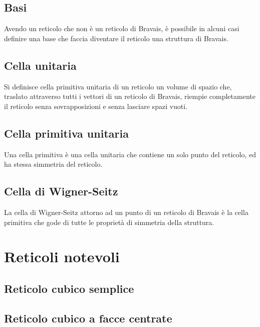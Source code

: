 \documentclass[10pt,a4paper]{report}
\begin{document}
		\subsection{Basi}
			Avendo un reticolo che non è un reticolo di Bravais, è possibile in alcuni casi definire una base che faccia diventare il reticolo una struttura di Bravais.
		
		\subsection{Cella unitaria}

			Si definisce cella primitiva unitaria di un reticolo un volume di spazio che, traslato attraverso tutti i vettori di un reticolo di Bravais, riempie completamente il reticolo senza sovrapposizioni e senza lasciare spazi vuoti.

		\subsection{Cella primitiva unitaria}
			Una cella primitiva è una cella unitaria che contiene un solo punto del reticolo, ed ha stessa simmetria del reticolo.
		
		\subsection{Cella di Wigner-Seitz}
				La cella di Wigner-Seitz attorno ad un punto di un reticolo di Bravais è la cella primitiva che gode di tutte le proprietà di simmetria della struttura.
			
			
			
	
	\section{Reticoli notevoli}
		
		\subsection{Reticolo cubico semplice}
			
	
		\subsection{Reticolo cubico a facce centrate}
	
\end{document}
